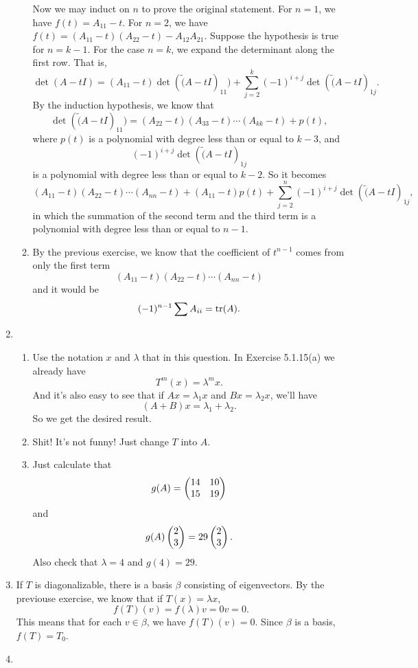\begin{enumerate}
\begin{enumerate}
Now we may induct on $n$ to prove the original statement. For $n=1$, we have $f(t)=A_{11}-t$. For $n=2$, we have $f(t)=(A_{11}-t)(A_{22}-t)-A_{12}A_{21}$. Suppose the hypothesis is true for $n=k-1$. For the case $n=k$, we expand the determinant along the first row. That is, 
\[\det(A-tI)=(A_{11}-t)\det(\tilde(A-tI)_{11})+\sum_{j=2}^k{(-1)^{i+j}\det(\tilde(A-tI)_{1j}}.\]
By the induction hypothesis, we know that 
\[\det(\tilde(A-tI)_{11})=(A_{22}-t)(A_{33}-t)\cdots (A_{kk}-t)+p(t),\]
where $p(t)$ is a polynomial with degree less than or equal to $k-3$, and 
\[(-1)^{i+j}\det(\tilde(A-tI)_{1j}\]
is a polynomial with degree less than or equal to $k-2$. So it becomes
\[(A_{11}-t)(A_{22}-t)\cdots (A_{nn}-t)+(A_{11}-t)p(t)+\sum_{j=2}^n{(-1)^{i+j}\det(\tilde(A-tI)_{1j}},\]
in which the summation of the second term and the third term is a polynomial with degree less than or equal to $n-1$.
\item By the previous exercise, we know that the coefficient of $t^{n-1}$ comes from only the first term 
\[(A_{11}-t)(A_{22}-t)\cdots (A_{nn}-t)\]
and it would be 
\[(-1)^{n-1}\sum{A_{ii}}=\operatorname{tr}(A).\]
\end{enumerate}
\item \begin{enumerate}
\item Use the notation $x$ and $\lambda $ that in this question. In Exercise 5.1.15(a) we already have 
\[T^m(x)=\lambda^m x.\]
And it's also easy to see that if $Ax=\lambda_1 x$ and $Bx=\lambda_2 x$, we'll have 
\[(A+B)x=\lambda_1+\lambda_2.\]
So we get the desired result.
\item Shit! It's not funny! Just change $T$ into $A$.
\item Just calculate that 
\[g(A)=\begin{pmatrix}14 & 10\cr 15 & 19\end{pmatrix}\]
and 
\[g(A)\begin{pmatrix}2\cr 3\end{pmatrix}=29\begin{pmatrix}2\cr 3\end{pmatrix}.\]
Also check that $\lambda =4$ and $g(4)=29$.
\end{enumerate}
\item If $T$ is diagonalizable, there is a basis $\beta $ consisting of eigenvectors. By the previouse exercise, we know that if $T(x)=\lambda x$, 
\[f(T)(v)=f(\lambda )v=0v=0.\]
This means that for each $v\in \beta $, we have $f(T)(v)=0$. Since $\beta $ is a basis, $f(T)=T_0$.
\item \begin{enumerate}

\end{enumerate}
\end{enumerate}
